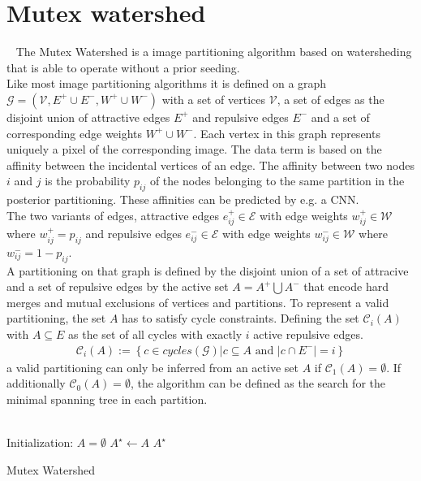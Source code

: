\section{Mutex watershed}~\label{sec:mtx_wtsd}
The Mutex Watershed \cite{wolf2019mutex} is a image partitioning algorithm based on watersheding that is able to operate without a prior seeding.\\
Like most image partitioning algorithms it is defined on a graph $\mathcal{G}=(\mathcal{V}, E^+ \cup E^-, W^+ \cup W^-)$ with a set of vertices $\mathcal{V}$, a set of edges as the disjoint union of attractive edges $E^+$ and repulsive edges $E^-$ and a set of corresponding edge weights $ W^+ \cup W^-$. Each vertex in this graph represents uniquely a pixel of the corresponding image. The data term is based on the affinity between the incidental vertices of an edge. The affinity between two nodes $i$ and $j$ is the probability $p_{ij}$ of the nodes belonging to the same partition in the posterior partitioning. These affinities can be predicted by e.g. a CNN. \\
The two variants of edges, attractive edges $e_{ij}^+ \in \mathcal{E}$ with edge weights $w_{ij}^+ \in \mathcal{W}$ where $w_{ij}^+ = p_{ij}$ and repulsive edges $e_{ij}^- \in \mathcal{E}$ with edge weights $w_{ij}^- \in \mathcal{W}$ where $w_{ij}^- = 1-p_{ij}$. \\
A partitioning on that graph is defined by the disjoint union of a set of attracive and a set of repulsive edges by the active set $A=A^+ \bigcup A^-$ that encode hard merges and mutual exclusions of vertices and partitions. To represent a valid partitioning, the set $A$ has to satisfy cycle constraints. Defining the set $\mathcal{C}_i(A)$  with $A\subseteq E$ as the set of all cycles with exactly $i$ active repulsive edges.
\begin{align}
	\mathcal{C}_i(A) := \left\{ c \in cycles(\mathcal{G}) \vert c \subseteq A \text{  and  } |c \cap E^- | = i \right\}
\end{align}
a valid partitioning can only be inferred from an active set $A$ if $\mathcal{C}_1(A) = \emptyset $. If additionally $\mathcal{C}_0(A) = \emptyset $, the algorithm can be defined as the search for the minimal spanning tree in each partition.\\
\vspace{8mm}\\
\begin{algorithm}[H]
	Initialization: $A = \emptyset$\;
	$A^\star \leftarrow A$ \;
	\Return $A^\star$
	\caption{Mutex Watershed \cite{wolf2019mutex}}
	\label{algo:mtx_wtsd}
\end{algorithm}
\vspace{8mm}

